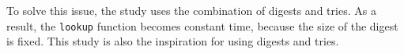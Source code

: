 To solve this issue, the study  uses the combination of digests and tries. As a result, the \texttt{lookup} function becomes constant time, because the size of the digest is fixed. This study is also the inspiration for using digests and tries.


